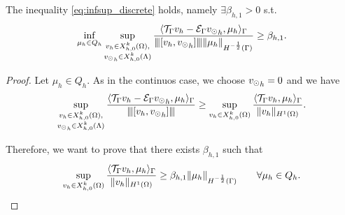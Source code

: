 \begin{theorem} The inequality \eqref{eq:infsup_discrete} holds, namely 
$\exists \beta_{h,1} >0$ s.t.
\begin{equation}\label{inf_sup_discrete_prob1}
\inf_{\mu_h \in Q_h} 
\sup_{\substack{v_h \in X_{h,0}^k(\Omega),\\ {\vd}_h \in X_{h,0}^k(\Lambda)}} \frac{ \langle \trace v_h - \ext {\vd}_h, \mu_h \rangle _{\Gamma}} {\vertiii{[v_h, {\vd} _h]} \|\mu_h\|_{H^{-\frac 12 }(\Gamma)}} 
\geq \beta_{h,1}. 
\end{equation}
\end{theorem}

\begin{proof}
Let $\mu_h \in Q_h$. As in the continuos case, we choose ${v_{\odot}}_h =0$ and we have
\begin{equation*}
\sup_{\substack{v_h \in X_{h,0}^k(\Omega),\\ {v_{\odot}}_h \in X_{h,0}^k(\Lambda)}} \frac{ \langle {\mathcal{T}_\Gamma} v_h - \mathcal{E}_\Gamma {v_{\odot}}_h, \mu_h \rangle _{\Gamma}} {{\left\vert\kern-0.25ex\left\vert\kern-0.25ex\left\vert [v_h,  {v_{\odot}}_h] \right\vert\kern-0.25ex\right\vert\kern-0.25ex\right\vert}}
\geq \sup_{v_h \in X_{h,0}^k(\Omega)} \frac{ \langle {\mathcal{T}_\Gamma} v_h, \mu_h \rangle _{\Gamma} } {\|v_h\|_{H^1(\Omega)}}.
\end{equation*}

Therefore, we want to prove that there exists $\beta_{h,1}$ such that
\begin{equation*}
\sup_{v_h \in X_{h,0}^k(\Omega)} \frac{ \langle {\mathcal{T}_\Gamma} v_h, \mu_h \rangle _{\Gamma} } {\|v_h\|_{H^1(\Omega)}} \geq \beta_{h,1} \|\mu_h\|_{H^{-\frac 12}(\Gamma)} \qquad \forall \mu_h \in Q_h.
\end{equation*}


\end{proof}
